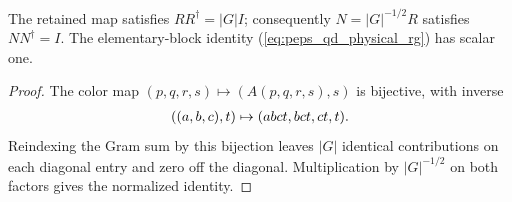 \begin{lemma}
    \label{thm:peps_qd_physical_rg_normalization}
    \leanok
    The retained map satisfies $RR^\dagger=|G|I$; consequently
    $N=|G|^{-1/2}R$ satisfies $NN^\dagger=I$.
    The elementary-block identity (\ref{eq:peps_qd_physical_rg}) has scalar one.
\end{lemma}
\begin{proof}\leanok
    The color map $(p,q,r,s)\mapsto(A(p,q,r,s),s)$ is bijective, with inverse
    \begin{align}
        ((a,b,c),t)\mapsto(abct,bct,ct,t).\notag
    \end{align}
    Reindexing the Gram sum by this bijection leaves $|G|$ identical
    contributions on each diagonal entry and zero off the diagonal.
    Multiplication by $|G|^{-1/2}$ on both factors gives the normalized identity.
\end{proof}
